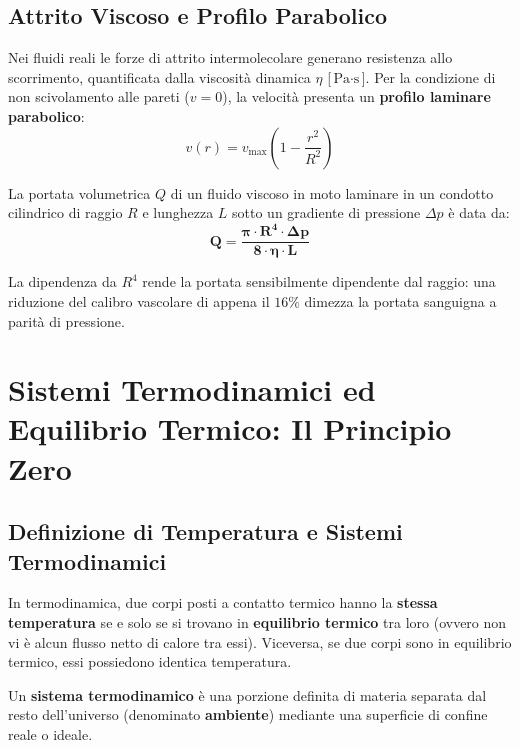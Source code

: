 \documentclass[11pt,a4paper,oneside]{report}
\begin{document}
\section{Attrito Viscoso e Profilo Parabolico}

Nei fluidi reali le forze di attrito intermolecolare generano resistenza allo scorrimento, quantificata dalla viscosit\`a dinamica $\eta$ [$\text{Pa}\cdot\text{s}$]. Per la condizione di non scivolamento alle pareti ($v = 0$), la velocit\`a presenta un \textbf{profilo laminare parabolico}:
\[
v(r) = v_{\text{max}} \left(1 - \frac{r^2}{R^2}\right)
\]

\begin{leggefisica}
La portata volumetrica $Q$ di un fluido viscoso in moto laminare in un condotto cilindrico di raggio $R$ e lunghezza $L$ sotto un gradiente di pressione $\Delta p$ \`e data da:
\[
\mathbf{Q = \frac{\pi \cdot R^4 \cdot \Delta p}{8 \cdot \eta \cdot L}}
\]
\end{leggefisica}

La dipendenza da $R^4$ rende la portata sensibilmente dipendente dal raggio: una riduzione del calibro vascolare di appena il $16\%$ dimezza la portata sanguigna a parit\`a di pressione.


\chapter{Sistemi Termodinamici ed Equilibrio Termico: Il Principio Zero}

\section{Definizione di Temperatura e Sistemi Termodinamici}

In termodinamica, due corpi posti a contatto termico hanno la \textbf{stessa temperatura} se e solo se si trovano in \textbf{equilibrio termico} tra loro (ovvero non vi \`e alcun flusso netto di calore tra essi). Viceversa, se due corpi sono in equilibrio termico, essi possiedono identica temperatura.

\begin{definizione}
Un \textbf{sistema termodinamico} \`e una porzione definita di materia separata dal resto dell'universo (denominato \textbf{ambiente}) mediante una superficie di confine reale o ideale.
\end{definizione}
\end{document}
